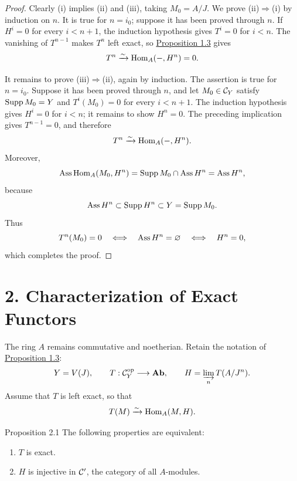 \begin{proof}
Clearly (i) implies (ii) and (iii), taking $M_0=A/J$. We prove
(ii)$\Rightarrow$(i) by induction on $n$. It is true for $n=i_0$; suppose it
has been proved through $n$. If $H^i=0$ for every $i<n+1$, the induction
hypothesis gives $T^i=0$ for $i<n$. The vanishing of $T^{n-1}$ makes $T^n$
left exact, so \hyperref[IV.1.3]{Proposition 1.3} gives
\[
  T^n\xrightarrow{\sim}\operatorname{Hom}_A(-,H^n)=0.
\]

It remains to prove (iii)$\Rightarrow$(ii), again by induction. The assertion
is true for $n=i_0$. Suppose it has been proved through $n$, and let
$M_0\in\mathcal C_Y$ satisfy $\operatorname{Supp} M_0=Y$ and $T^i(M_0)=0$ for every $i<n+1$.
The induction hypothesis gives $H^i=0$ for $i<n$; it remains to show
$H^n=0$. The preceding implication gives $T^{n-1}=0$, and therefore
\[
  T^n\xrightarrow{\sim}\operatorname{Hom}_A(-,H^n).
\]
Moreover,
\[
  \operatorname{Ass}\operatorname{Hom}_A(M_0,H^n)
  =\operatorname{Supp} M_0\cap\operatorname{Ass} H^n
  =\operatorname{Ass} H^n,
\]
because
\[
  \operatorname{Ass} H^n\subset\operatorname{Supp} H^n\subset Y=\operatorname{Supp} M_0.
\]
Thus
\[
  T^n(M_0)=0
  \quad\Longleftrightarrow\quad
  \operatorname{Ass} H^n=\varnothing
  \quad\Longleftrightarrow\quad
  H^n=0,
\]
which completes the proof.
\end{proof}


\section*{2. Characterization of Exact Functors}

The ring $A$ remains commutative and noetherian. Retain the notation of
\hyperref[IV.1.3]{Proposition 1.3}:
\[
  Y=V(J),\qquad
  T:\mathcal C_Y^{\mathrm{op}}\longrightarrow\mathbf{Ab},\qquad
  H=\varinjlim_n T(A/J^n).
\]
Assume that $T$ is left exact, so that
\[
  T(M)\xrightarrow{\sim}\operatorname{Hom}_A(M,H).
\]

\begin{sgastatement}{Proposition 2.1}
The following properties are equivalent:
\begin{enumerate}[label=\textup{\roman*)},leftmargin=2.7em]
\item $T$ is exact.
\item $H$ is injective in $\mathcal C'$, the category of all $A$-modules.
\end{enumerate}
\end{sgastatement}

